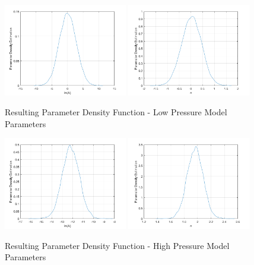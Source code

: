 \documentclass{article}
\begin{document}
\begin{figure}[htb!]
\centering
\includegraphics[width=0.48\textwidth]{PDF_lnA_LP.png}
\includegraphics[width=0.48\textwidth]{PDF_n_LP.png}
\caption{Resulting Parameter Density Function - Low Pressure Model Parameters}
\label{LPpdf}
\end{figure}

\begin{figure}[htb!]
\centering
\includegraphics[width=0.48\textwidth]{PDF_lnA_HP.png}
\includegraphics[width=0.48\textwidth]{PDF_n_HP.png}
\caption{Resulting Parameter Density Function - High Pressure Model Parameters}
\label{HPpdf}
\end{figure}
\end{document}
